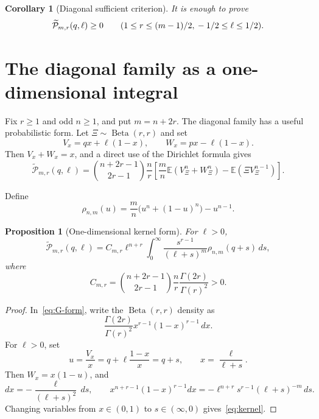 \documentclass[11pt]{article}
\newtheorem{proposition}[theorem]{Proposition}
\newtheorem{corollary}[theorem]{Corollary}
\newcommand{\E}{\mathbb E}
\newcommand{\wtP}{\widetilde{\mathcal P}}
\newcommand{\Beta}{\operatorname{Beta}}
\begin{document}
\begin{corollary}[Diagonal sufficient criterion]\label{cor:diagonal}
It is enough to prove
\[
        \wtP_{m,r}(q,\ell)\ge0
        \qquad
        (1\le r\le(m-1)/2,\\ -1/2\le\ell\le1/2).
\]
\end{corollary}

\section{The diagonal family as a one-dimensional integral}\label{sec:kernel}

Fix $r\ge1$ and odd $n\ge1$, and put $m=n+2r$.  The diagonal family has a useful probabilistic form.  Let $\Xi\sim\Beta(r,r)$ and set
\[
        V_x=qx+\ell(1-x),
        \qquad
        W_x=px-\ell(1-x).
\]
Then $V_x+W_x=x$, and a direct use of the Dirichlet formula gives
\begin{equation}\label{eq:G-form}
        \wtP_{m,r}(q,\ell)=
        \binom{n+2r-1}{2r-1}\frac nr
        \left[
        \frac mn\E(V_\Xi^n+W_\Xi^n)-\E(\Xi V_\Xi^{n-1})
        \right].
\end{equation}

Define
\begin{equation}\label{eq:rho-def}
        \rho_{n,m}(u)=\frac mn\bigl(u^n+(1-u)^n\bigr)-u^{n-1}.
\end{equation}

\begin{proposition}[One-dimensional kernel form]\label{prop:kernel}
For $\ell>0$,
\begin{equation}\label{eq:kernel}
        \wtP_{m,r}(q,
        \ell)=C_{m,r}\ell^{n+r}
        \int_0^\infty \frac{s^{r-1}}{(\ell+s)^m}\rho_{n,m}(q+s)\,ds,
\end{equation}
where
\[
        C_{m,r}=\binom{n+2r-1}{2r-1}\frac nr\frac{\Gamma(2r)}{\Gamma(r)^2}>0.
\]
\end{proposition}

\begin{proof}
In~\eqref{eq:G-form}, write the $\Beta(r,r)$ density as
\[
        \frac{\Gamma(2r)}{\Gamma(r)^2}x^{r-1}(1-x)^{r-1}\,dx.
\]
For $\ell>0$, set
\[
        u=\frac{V_x}{x}=q+\ell\frac{1-x}{x}=q+s,
        \qquad
        x=\frac{\ell}{\ell+s}.
\]
Then $W_x=x(1-u)$, and
\[
        dx=-\frac{\ell}{(\ell+s)^2}\,ds,
        \qquad
        x^{n+r-1}(1-x)^{r-1}dx
        =-\ell^{n+r}s^{r-1}(\ell+s)^{-m}\,ds.
\]
Changing variables from $x\in(0,1)$ to $s\in(\infty,0)$ gives~\eqref{eq:kernel}.
\end{proof}
\end{document}
